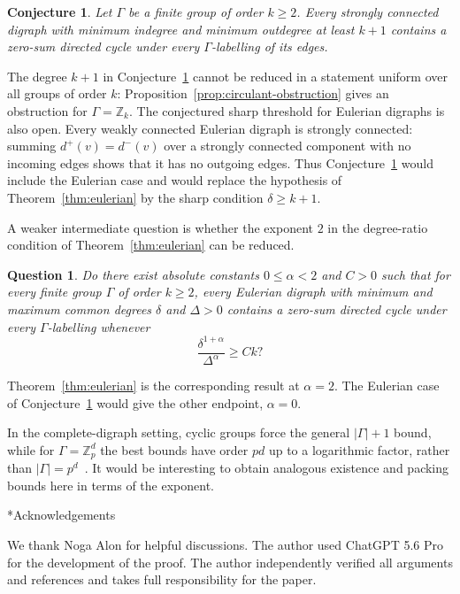 \documentclass[11pt]{amsart}
\makeatletter
\def\section{\@startsection{section}{1}%
  \z@{1.5\linespacing\@plus.6\linespacing}{.65\linespacing}%
  {\normalfont\Large\bfseries\raggedright}}
\newtheorem{conjecture}[theorem]{Conjecture}
\newtheorem{question}[theorem]{Question}
\theoremstyle{remark}
\makeatother
\begin{document}
\begin{conjecture}\label{conj:strongly-connected}
Let $\Gamma$ be a finite group of order $k\ge2$.  Every strongly
connected digraph with minimum indegree and minimum outdegree at least
$k+1$ contains a zero-sum directed cycle under every $\Gamma$-labelling
of its edges.
\end{conjecture}

The degree $k+1$ in Conjecture~\ref{conj:strongly-connected} cannot be
reduced in a statement uniform over all groups of order $k$:
Proposition~\ref{prop:circulant-obstruction} gives an obstruction for
$\Gamma=\mathbb Z_k$.  The conjectured sharp threshold for Eulerian
digraphs is also open.  Every weakly connected Eulerian digraph is
strongly connected: summing $d^+(v)=d^-(v)$ over a strongly connected
component with no incoming edges shows that it has no outgoing edges.
Thus Conjecture~\ref{conj:strongly-connected} would include the Eulerian
case and would replace the hypothesis of
Theorem~\ref{thm:eulerian} by the sharp condition $\delta\ge k+1$.

A weaker intermediate question is whether the exponent $2$ in the
degree-ratio condition of Theorem~\ref{thm:eulerian} can be reduced.

\begin{question}\label{question:degree-ratio}
Do there exist absolute constants $0\le\alpha<2$ and $C>0$ such that
for every finite group $\Gamma$ of order $k\ge2$, every Eulerian
digraph with minimum and maximum common degrees $\delta$ and $\Delta>0$
contains a zero-sum directed cycle under every $\Gamma$-labelling
whenever
\[
  \frac{\delta^{1+\alpha}}{\Delta^\alpha}\ge Ck?
\]
\end{question}

Theorem~\ref{thm:eulerian} is the corresponding result at $\alpha=2$.
The Eulerian case of Conjecture~\ref{conj:strongly-connected} would give
the other endpoint, $\alpha=0$.

In the complete-digraph setting, cyclic groups force the general
$|\Gamma|+1$ bound, while for $\Gamma=\mathbb Z_p^d$ the best bounds have
order $pd$ up to a logarithmic factor, rather than
$|\Gamma|=p^d$~\cite{LetzterMorrison,ChristophEtAl}.  It would be
interesting to obtain analogous existence and packing bounds here in
terms of the exponent.

\section*{Acknowledgements}

We thank Noga Alon for helpful discussions.  The author used ChatGPT
5.6 Pro for the development of the proof.  The author independently
verified all arguments and references and takes full responsibility for
the paper.

\clearpage


\end{document}
